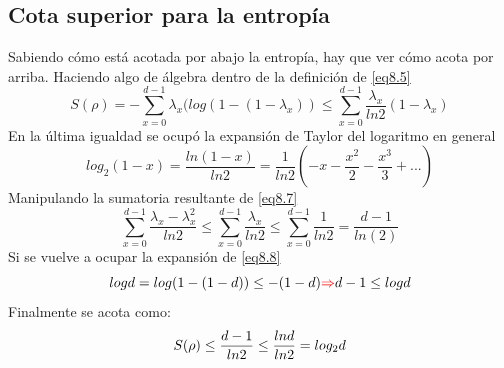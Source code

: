 \documentclass{book}
\begin{document}
    \subsection{{Cota superior para la entropía}} Sabiendo cómo está acotada por abajo la entropía, hay que ver cómo acota por arriba. Haciendo algo de álgebra dentro de la definición de \ref{eq8.5}
      \begin{equation}\label{eq8.7}{ S(\rho)=-\sum_{x=0}^{d-1}\lambda_x(log(1-(1-\lambda_x))\leq \sum_{x=0}^{d-1} \frac{\lambda_x}{ln 2}(1-\lambda_x)}\end{equation}
      En la última igualdad se ocupó la expansión de Taylor del logaritmo en general
          \begin{equation}\label{eq8.8}{log_2(1-x)=\frac{ln(1-x)}{ln 2}=\frac{1}{ln 2}(-x-\frac{x^2}{2}-\frac{x^3}{3}+...)}\end{equation}
   Manipulando la sumatoria  resultante de \ref{eq8.7}
   \begin{equation}\label{eq8.9}{\sum_{x=0}^{d-1}\frac{\lambda_x-\lambda_x^2}{ln 2}\leq \sum_{x=0}^{d-1}\frac{\lambda_x}{ln 2}\leq  \sum_{x=0}^{d-1}\frac{1}{ln 2}=\frac{d-1}{ln(2)}} \end{equation}
   Si se vuelve a ocupar la expansión de \ref{eq8.8}
   \begin{equation}\label{eq8.10}{ log d =log(1-(1-d)) \leq -(1-d) \textcolor{red}{\Rightarrow} d-1 \leq log d}\end{equation}
   Finalmente se acota como:
   \begin{equation}{\label{eq8.11}S(\rho)\leq \frac{d-1}{ln 2} \leq \frac{ln d}{ln 2} = log_2 d}\end{equation}
\end{document}
